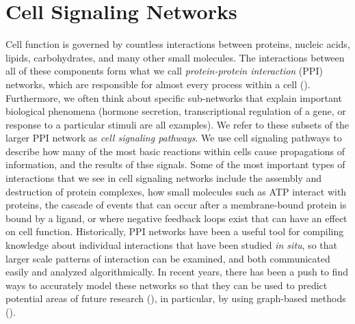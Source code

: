 \documentclass[12pt,twoside]{reedthesis}
\theoremstyle{definition}
\begin{document}
\chapter{Cell Signaling Networks}

Cell function is governed by countless interactions between proteins, nucleic acids, lipids, carbohydrates, and many other small molecules.  The interactions between all of these components form what we call \textit{protein-protein interaction} (PPI) networks, which are responsible for almost every process within a cell (\cite{Taylor2009}). Furthermore, we often think about specific sub-networks that explain important biological phenomena (hormone secretion, transcriptional regulation of a gene, or response to a particular stimuli are all examples). We refer to these subsets of the larger PPI network as \textit{cell signaling pathways}. We use cell signaling pathways to describe how many of the most basic reactions within cells cause propagations of information, and the results of thse signals.  Some of the most important types of interactions that we see in cell signaling networks include the assembly and destruction of protein complexes, how small molecules such as ATP interact with proteins, the cascade of events that can occur after a membrane-bound protein is bound by a ligand, or where negative feedback loops exist that can have an effect on cell function.  Historically, PPI networks have been a useful tool for compiling knowledge about individual interactions that have been studied \textit{in situ}, so that larger scale patterns of interaction can be examined, and both communicated easily and analyzed algorithmically. In recent years, there has been a push to find ways to accurately model these networks so that they can be used to predict potential areas of future research (\cite{Haverty2004}), in particular, by using graph-based methods (\cite{Aittokallio2006}).\par
\end{document}
